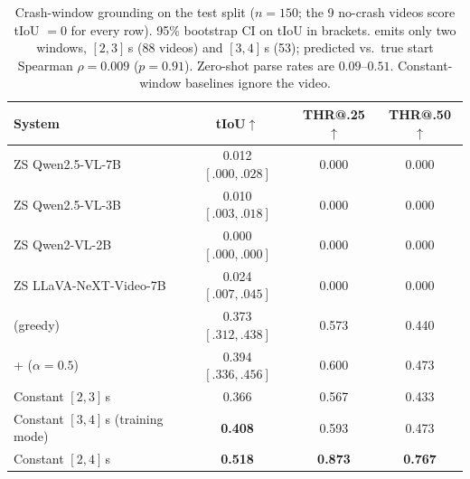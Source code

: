 \begin{table}[!t]
\centering
\caption{Crash-window grounding on the \dataset{} test split ($n{=}150$; the 9 no-crash videos score tIoU $=0$ for every row). 95\% bootstrap CI on tIoU in brackets. \crashlogic{} emits only two windows, $[2,3]$\,s (88 videos) and $[3,4]$\,s (53); predicted vs.\ true start Spearman $\rho{=}0.009$ ($p{=}0.91$). Zero-shot parse rates are $0.09$--$0.51$. Constant-window baselines ignore the video.}
\label{tab:e3}
\small
\setlength{\tabcolsep}{8pt}
\begin{tabular*}{\textwidth}{@{\extracolsep{\fill}}lccc@{}}
\toprule
\textbf{System} & \textbf{tIoU}$\uparrow$ & \textbf{THR@.25}$\uparrow$ & \textbf{THR@.50}$\uparrow$ \\
\midrule
ZS Qwen2.5-VL-7B        & 0.012 $[.000,.028]$ & 0.000 & 0.000 \\
ZS Qwen2.5-VL-3B        & 0.010 $[.003,.018]$ & 0.000 & 0.000 \\
ZS Qwen2-VL-2B          & 0.000 $[.000,.000]$ & 0.000 & 0.000 \\
ZS LLaVA-NeXT-Video-7B  & 0.024 $[.007,.045]$ & 0.000 & 0.000 \\
\midrule
\crashlogic{} (greedy)                  & 0.373 $[.312,.438]$ & 0.573 & 0.440 \\
\crashlogic{} + \tcd{} ($\alpha{=}0.5$) & 0.394 $[.336,.456]$ & 0.600 & 0.473 \\
\midrule
Constant $[2,3]$\,s                     & 0.366 & 0.567 & 0.433 \\
Constant $[3,4]$\,s (training mode)     & \textbf{0.408} & 0.593 & 0.473 \\
Constant $[2,4]$\,s                     & \textbf{0.518} & \textbf{0.873} & \textbf{0.767} \\
\bottomrule
\end{tabular*}
\end{table}
